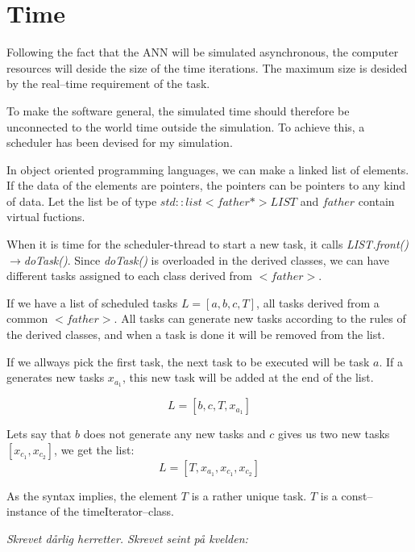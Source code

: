 
\section{Time}

Following the fact that the ANN will be simulated asynchronous, the computer resources will deside the size of the time iterations. The maximum size is desided by the real--time requirement of the task.

To make the software general, the simulated time should therefore be unconnected to the world time outside the simulation. To achieve this, a scheduler has been devised for my simulation.


In object oriented programming languages, we can make a linked list of elements. 
If the data of the elements are pointers, the pointers can be pointers to any kind of data. Let the list be of type \emph{$std::list<father*> LIST$} and \emph{$father$} contain virtual fuctions. 

When it is time for the scheduler-thread to start a new task, it calls \emph{LIST.front()$\rightarrow$doTask()}. 
Since \emph{doTask()} is overloaded in the derived classes, we can have different tasks assigned to each class derived from \emph{$<father>$}.




If we have a list of scheduled tasks $L = [a, b, c, T]$, all tasks derived from a common \emph{$<father>$}. 
All tasks can generate new tasks according to the rules of the derived classes, and when a task is done it will be removed from the list.

If we allways pick the first task, the next task to be executed will be task $a$. %
If a generates new tasks $x_{a_1}$, this new task will be added at the end of the list.

\begin{equation}
	L = [b, c, T, x_{a_1}]
\end{equation}

Lets say that $b$ does not generate any new tasks and $c$ gives us two new tasks $[x_{c_1}, x_{c_2}]$, we get the list:
\begin{equation}
	L = [T, x_{a_1}, x_{c_1}, x_{c_2} ]
\end{equation}

As the syntax implies, the element $T$ is a rather unique task. $T$ is a const--instance of the timeIterator--class.


\emph{Skrevet dårlig herretter. Skrevet seint på kvelden:} %

